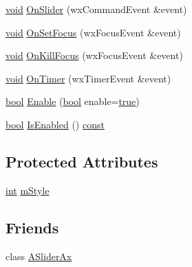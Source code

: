 \begin{DoxyCompactItemize}
\item 
\hyperlink{sound_8c_ae35f5844602719cf66324f4de2a658b3}{void} \hyperlink{class_a_slider_ab23da6a05a58ad1052b034c60b221c99}{On\+Slider} (wx\+Command\+Event \&event)
\item 
\hyperlink{sound_8c_ae35f5844602719cf66324f4de2a658b3}{void} \hyperlink{class_a_slider_a106789aa0794b29e09f3222d058f3c2a}{On\+Set\+Focus} (wx\+Focus\+Event \&event)
\item 
\hyperlink{sound_8c_ae35f5844602719cf66324f4de2a658b3}{void} \hyperlink{class_a_slider_aa18169b3488232035eccf04902e78f55}{On\+Kill\+Focus} (wx\+Focus\+Event \&event)
\item 
\hyperlink{sound_8c_ae35f5844602719cf66324f4de2a658b3}{void} \hyperlink{class_a_slider_a8d8258f738ef07a2012b8d318382f1dc}{On\+Timer} (wx\+Timer\+Event \&event)
\item 
\hyperlink{mac_2config_2i386_2lib-src_2libsoxr_2soxr-config_8h_abb452686968e48b67397da5f97445f5b}{bool} \hyperlink{class_a_slider_aca598a373346be1c65f055b20f80bff6}{Enable} (\hyperlink{mac_2config_2i386_2lib-src_2libsoxr_2soxr-config_8h_abb452686968e48b67397da5f97445f5b}{bool} enable=\hyperlink{mac_2config_2i386_2lib-src_2libsoxr_2soxr-config_8h_a41f9c5fb8b08eb5dc3edce4dcb37fee7}{true})
\item 
\hyperlink{mac_2config_2i386_2lib-src_2libsoxr_2soxr-config_8h_abb452686968e48b67397da5f97445f5b}{bool} \hyperlink{class_a_slider_a7040e8291cf1d870469f74a6e208ff62}{Is\+Enabled} () \hyperlink{getopt1_8c_a2c212835823e3c54a8ab6d95c652660e}{const} 
\end{DoxyCompactItemize}
\subsection*{Protected Attributes}
\begin{DoxyCompactItemize}
\item 
\hyperlink{xmltok_8h_a5a0d4a5641ce434f1d23533f2b2e6653}{int} \hyperlink{class_a_slider_a4fbd041793a160628540d5866b885f32}{m\+Style}
\end{DoxyCompactItemize}
\subsection*{Friends}
\begin{DoxyCompactItemize}
\item 
class \hyperlink{class_a_slider_a2167247864d69763e5d637b4d62ccd88}{A\+Slider\+Ax}
\end{DoxyCompactItemize}


